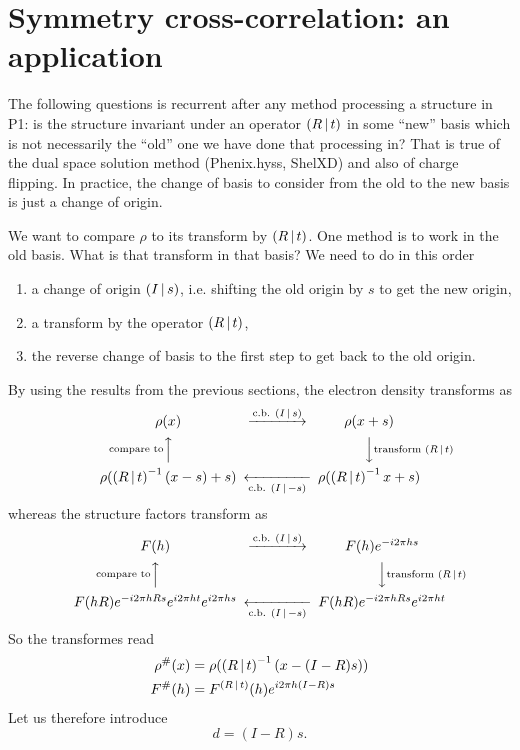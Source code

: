 \documentclass[11pt]{article}
\begin{document}
\section{Symmetry cross-correlation: an application}

The following questions is recurrent after any method processing a structure in P1: is the structure invariant under an operator $\left( R\,\vert\, t \right)$ in some ``new'' basis which is not necessarily the ``old'' one we have done that processing in? That is true of the dual space solution method (Phenix.hyss, ShelXD) and also of charge flipping. In practice, the change of basis to consider from the old to the new basis is just a change of origin.

We want to compare $\rho$ to its transform by $\left( R\,\vert\, t \right)$. One method is to work in the old basis. What is that transform in that basis? We need to do in this order
\begin{enumerate}
\item a change of origin $\left( I\,\vert\, s \right)$, i.e. shifting the old origin by $s$ to get the new origin,
\item a transform by the operator $\left( R\,\vert\, t \right)$,
\item the reverse change of basis to the first step to get back to the old origin.
\end{enumerate}
By using the results from the previous sections, the electron density transforms as
\begin{equation*}
\begin{CD}
\rho(x)                                  @>{\text{c.b. } \sym{I}{s}}>>   \rho(x+s)                               \\
@A{\text{compare to}}AA                                      @VV{\text{transform } \sym{R}{t}}V         \\
\rho(\sym{R}{t}^{-1}(x-s) + s)   @<<{\text{c.b. } \sym{I}{-s}}< \rho(\sym{R}{t}^{-1}x + s)
\end{CD}
\end{equation*}
whereas the structure factors transform as
\begin{equation*}
\begin{CD}
F(h)                                  @>{\text{c.b. } \sym{I}{s}}>>   F(h)e^{-i2\pi hs}            \\
@A{\text{compare to}}AA                                      @VV{\text{transform } \sym{R}{t}}V    \\
F(hR)e^{-i2\pi hRs}e^{i2\pi ht}e^{i2\pi hs}   @<<{\text{c.b. } \sym{I}{-s}}< F(hR)e^{-i2\pi hRs}e^{i2\pi ht}
\end{CD}
\end{equation*}
So the transformes read
\begin{align}
\rho^\#(x) &= \rho(\left( R\,\vert\, t \right)^{-1}(x - (I-R)s))\\
F^\#(h) &= F^{\left( R\,\vert\, t \right)}(h) e^{i2\pi h(I-R)s} \label{translation::search::F}
\end{align}
Let us therefore introduce
\begin{equation}
d = (I-R)s. \label{def::d}
\end{equation}
\end{document}
